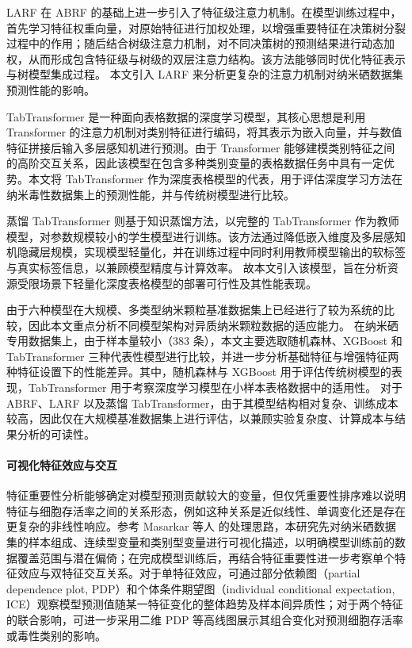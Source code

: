 \documentclass[letterpaper]{article}
\begin{document}
LARF 在 ABRF 的基础上进一步引入了特征级注意力机制。在模型训练过程中，首先学习特征权重向量，对原始特征进行加权处理，以增强重要特征在决策树分裂过程中的作用；随后结合树级注意力机制，对不同决策树的预测结果进行动态加权，从而形成包含特征级与树级的双层注意力结构。该方法能够同时优化特征表示与树模型集成过程。
本文引入 LARF 来分析更复杂的注意力机制对纳米硒数据集预测性能的影响。

TabTransformer 是一种面向表格数据的深度学习模型，其核心思想是利用 Transformer 的注意力机制对类别特征进行编码，将其表示为嵌入向量，并与数值特征拼接后输入多层感知机进行预测。由于 Transformer 能够建模类别特征之间的高阶交互关系，因此该模型在包含多种类别变量的表格数据任务中具有一定优势。本文将 TabTransformer 作为深度表格模型的代表，用于评估深度学习方法在纳米毒性数据集上的预测性能，并与传统树模型进行比较。

蒸馏 TabTransformer 则基于知识蒸馏方法，以完整的 TabTransformer 作为教师模型，对参数规模较小的学生模型进行训练。该方法通过降低嵌入维度及多层感知机隐藏层规模，实现模型轻量化，并在训练过程中同时利用教师模型输出的软标签与真实标签信息，以兼顾模型精度与计算效率。
故本文引入该模型，旨在分析资源受限场景下轻量化深度表格模型的部署可行性及其性能表现。

由于六种模型在大规模、多类型纳米颗粒基准数据集上已经进行了较为系统的比较，因此本文重点分析不同模型架构对异质纳米颗粒数据的适应能力。
在纳米硒专用数据集上，由于样本量较小（383 条），本文主要选取随机森林、XGBoost 和 TabTransformer 三种代表性模型进行比较，并进一步分析基础特征与增强特征两种特征设置下的性能差异。其中，随机森林与 XGBoost 用于评估传统树模型的表现，TabTransformer 用于考察深度学习模型在小样本表格数据中的适用性。
对于 ABRF、LARF 以及蒸馏 TabTransformer，由于其模型结构相对复杂、训练成本较高，因此仅在大规模基准数据集上进行评估，以兼顾实验复杂度、计算成本与结果分析的可读性。

\paragraph{可视化特征效应与交互}
特征重要性分析能够确定对模型预测贡献较大的变量，但仅凭重要性排序难以说明特征与细胞存活率之间的关系形态，例如这种关系是近似线性、单调变化还是存在更复杂的非线性响应。参考 Masarkar 等人 \cite{masarkar2024} 的处理思路，本研究先对纳米硒数据集的样本组成、连续型变量和类别型变量进行可视化描述，以明确模型训练前的数据覆盖范围与潜在偏倚；在完成模型训练后，再结合特征重要性进一步考察单个特征效应与双特征交互关系。对于单特征效应，可通过部分依赖图（partial dependence plot, PDP）和个体条件期望图（individual conditional expectation, ICE）观察模型预测值随某一特征变化的整体趋势及样本间异质性；对于两个特征的联合影响，可进一步采用二维 PDP 等高线图展示其组合变化对预测细胞存活率或毒性类别的影响。
\end{document}
